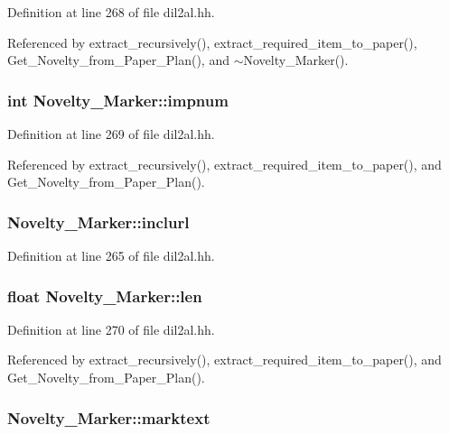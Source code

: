 Definition at line 268 of file dil2al.hh.

Referenced by extract\_\-recursively(), extract\_\-required\_\-item\_\-to\_\-paper(), Get\_\-Novelty\_\-from\_\-Paper\_\-Plan(), and $\sim$Novelty\_\-Marker().
\subsubsection{\setlength{\rightskip}{0pt plus 5cm}int Novelty\_\-Marker::impnum}\label{classNovelty__Marker_m6}




Definition at line 269 of file dil2al.hh.

Referenced by extract\_\-recursively(), extract\_\-required\_\-item\_\-to\_\-paper(), and Get\_\-Novelty\_\-from\_\-Paper\_\-Plan().
\subsubsection{ Novelty\_\-Marker::inclurl}\label{classNovelty__Marker_m3}




Definition at line 265 of file dil2al.hh.
\subsubsection{\setlength{\rightskip}{0pt plus 5cm}float Novelty\_\-Marker::len}\label{classNovelty__Marker_m7}




Definition at line 270 of file dil2al.hh.

Referenced by extract\_\-recursively(), extract\_\-required\_\-item\_\-to\_\-paper(), and Get\_\-Novelty\_\-from\_\-Paper\_\-Plan().
\subsubsection{ Novelty\_\-Marker::marktext}\label{classNovelty__Marker_m2}




